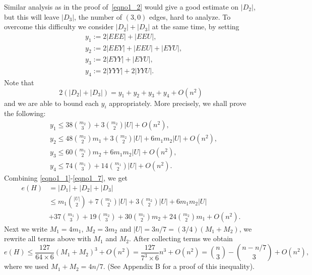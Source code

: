 \documentclass[11pt, reqno]{amsart}    	%
\theoremstyle{definition}
\def\cT{\mathcal T}
\numberwithin{equation}{section}
\begin{document}
	Similar analysis as in the proof of~\eqref{eqno1_2} would give a good estimate on $|D_2|$, but this will leave $|D_3|$, the number of $(3,0)$ edges, hard to analyze.
	To overcome this difficulty we consider $ |D_{2}|+|D_{3}| $ at the same time, by setting 
	\[\begin{split}
		&y_{1}:= 2|EEE|+|EEU|,\\
		&y_{2}:= 2|EEY|+|EEU|+|EYU|,\\
		& y_{3}:= 2|EYY|+|EYU|,\\
		& y_{4}:= 2|YYY|+2|YYU|.
	\end{split}\]
	Note that \begin{equation}
		2(|D_{2}|+|D_{3}|)=y_{1}+y_{2}+y_{3}+y_{4}+O(n^2)
	\end{equation}
	and we are able to bound each $y_i$ appropriately.
	More precisely, we shall prove the following:
	\begin{align*}
		&y_{1}\le  38\binom{m_2}{3}+3\binom{m_2}{2}|U|+O(n^2)\tag{6.4}\label{eqno1_4},\\
		&y_{2}\le 48\binom{m_2}{2}m_1+3\binom{m_2}{2}|U|+6m_1m_2|U|+O(n^2)\tag{6.5},\\
		&y_{3}\le 60\binom{m_1}{2}m_2+6m_1m_2|U|+O(n^2)\tag{6.6},\\
		&y_{4}\le  74\binom{m_1}{3}+14\binom{m_1}{2}|U|+O(n^2).	\tag{6.7}\label{eqno1_7}
	\end{align*}
	Combining \eqref{eqno1_1}-\eqref{eqno1_7}, we get
	\begin{align*}\label{eq1_9}
		e(H)&=|D_{1}|+|D_{2}|+|D_{3}|\\
		&\le m_1 \binom{|U|}{2}+7\binom{m_1}{2}|U|+3\binom{m_2}{2}|U|+6m_1m_2|U|\\&+37\binom{m_1}{3}+19\binom{m_2}{3}+30\binom{m_1}{2}m_2+24\binom{m_2}{2}m_1+O(n^2). \tag{6.9}
	\end{align*}
	Next we write $M_1=4m_1$, $M_2=3m_2$ and $|U|=3n/7=(3/4)(M_1+M_2)$, we rewrite all terms above with $M_1$ and $M_2$. After collecting terms we obtain
	\[\label{6.10}
	e(H)\le \frac{127}{64\times 6}(M_1+M_2)^3 + O(n^2) = \frac{127}{7^3\times 6}n^3+O(n^2) = \binom{n}{3}-\binom{n- n/7}{3}+O(n^2),
\tag{6.10}	\]
	where we used $M_1+M_2=4n/7$. (See Appendix B for a proof of this inequality).
	
\end{document}
